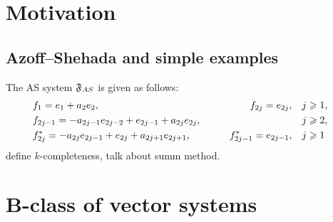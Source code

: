 \documentclass[12pt]{article}
\begin{document}


\section{Motivation}
  \subsection{Azoff--Shehada and simple examples}
      The AS system $\mathfrak{F}_{AS}$ is given as follows:
      \begin{equation}
        \label{as-sys}
        \begin{aligned}
          &f_1 = e_1 + a_2 e_2, \qquad &f_{2j}=e_{2j}, \quad&j \geq 1,&\\
          &f_{2j-1}=-a_{2j-1}e_{2j-2} + e_{2j-1} + a_{2j}e_{2j}, \qquad &\makebox[5em]{} \quad&j \geq 2,&\\
          &f^*_{2j}=-a_{2j}e_{2j-1}+e_{2j}+a_{2j+1}e_{2j+1}, \qquad &f^*_{2j-1}=e_{2j-1}, \quad&j \geq 1&
        \end{aligned}
      \end{equation}
      define $k$-completeness, talk about summ method.
\section{B-class of vector systems}
\end{document}
